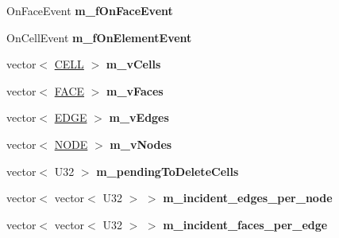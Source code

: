 \begin{DoxyCompactItemize}
\item 
\hypertarget{classps_1_1elastic_1_1VolMesh_a2586742c1c69d289fb03a5760048a198}{}On\+Face\+Event {\bfseries m\+\_\+f\+On\+Face\+Event}\label{classps_1_1elastic_1_1VolMesh_a2586742c1c69d289fb03a5760048a198}

\item 
\hypertarget{classps_1_1elastic_1_1VolMesh_a147ceb73a33f31ca4205d7f74866b5ed}{}On\+Cell\+Event {\bfseries m\+\_\+f\+On\+Element\+Event}\label{classps_1_1elastic_1_1VolMesh_a147ceb73a33f31ca4205d7f74866b5ed}

\item 
\hypertarget{classps_1_1elastic_1_1VolMesh_a5055d98d4124c7f8fccbe503a2152354}{}vector$<$ \hyperlink{classps_1_1elastic_1_1CELL}{C\+E\+L\+L} $>$ {\bfseries m\+\_\+v\+Cells}\label{classps_1_1elastic_1_1VolMesh_a5055d98d4124c7f8fccbe503a2152354}

\item 
\hypertarget{classps_1_1elastic_1_1VolMesh_a466ed1e2d8ede1b420b48494e8394efa}{}vector$<$ \hyperlink{classps_1_1elastic_1_1FACE}{F\+A\+C\+E} $>$ {\bfseries m\+\_\+v\+Faces}\label{classps_1_1elastic_1_1VolMesh_a466ed1e2d8ede1b420b48494e8394efa}

\item 
\hypertarget{classps_1_1elastic_1_1VolMesh_a12f235278685485ee19a1961bd84ee71}{}vector$<$ \hyperlink{classps_1_1elastic_1_1EDGE}{E\+D\+G\+E} $>$ {\bfseries m\+\_\+v\+Edges}\label{classps_1_1elastic_1_1VolMesh_a12f235278685485ee19a1961bd84ee71}

\item 
\hypertarget{classps_1_1elastic_1_1VolMesh_ac8c81f57ae9d68ab8beddf23b80f86d3}{}vector$<$ \hyperlink{classps_1_1elastic_1_1NODE}{N\+O\+D\+E} $>$ {\bfseries m\+\_\+v\+Nodes}\label{classps_1_1elastic_1_1VolMesh_ac8c81f57ae9d68ab8beddf23b80f86d3}

\item 
\hypertarget{classps_1_1elastic_1_1VolMesh_a5af6bf59ecdd483513388224a5480810}{}vector$<$ U32 $>$ {\bfseries m\+\_\+pending\+To\+Delete\+Cells}\label{classps_1_1elastic_1_1VolMesh_a5af6bf59ecdd483513388224a5480810}

\item 
\hypertarget{classps_1_1elastic_1_1VolMesh_ab2bfe4c4e3a0cf2d0a344f3a11fd9563}{}vector$<$ vector$<$ U32 $>$ $>$ {\bfseries m\+\_\+incident\+\_\+edges\+\_\+per\+\_\+node}\label{classps_1_1elastic_1_1VolMesh_ab2bfe4c4e3a0cf2d0a344f3a11fd9563}

\item 
\hypertarget{classps_1_1elastic_1_1VolMesh_a4ab9053ced0be3f2e70b5c624f98d8b1}{}vector$<$ vector$<$ U32 $>$ $>$ {\bfseries m\+\_\+incident\+\_\+faces\+\_\+per\+\_\+edge}\label{classps_1_1elastic_1_1VolMesh_a4ab9053ced0be3f2e70b5c624f98d8b1}


\end{DoxyCompactItemize}
